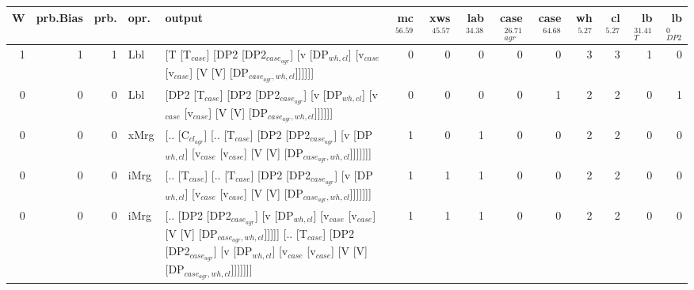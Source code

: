 \begin{tabularx}{\linewidth}{rrrlXrrrrrrrrr}
\hline
   W &   prb.Bias &   prb. & opr.   & output                                                                                                                                                                                 &   mc$^{56.59}$ &   xws$^{45.57}$ &   lab$^{34.38}$ &   case$_{agr}^{26.71}$ &   case$^{64.68}$ &   wh$^{5.27}$ &   cl$^{5.27}$ &   lb$_{T}^{31.41}$ &   lb$_{DP2}^{0}$ \\
\hline
   1 &       1 &   1 & Lbl  & [T [T$_{case}$] [DP2 [DP2$_{case_{agr}}$] [v [DP$_{wh,cl}$] [v$_{case}$ [v$_{case}$] [V [V] [DP$_{case_{agr},wh,cl}$]]]]]]                                                                                         &            0 &             0 &             0 &                  0 &              0 &           3 &           3 &              1 &            0 \\
   0 &       0 &   0 & Lbl  & [DP2 [T$_{case}$] [DP2 [DP2$_{case_{agr}}$] [v [DP$_{wh,cl}$] [v$_{case}$ [v$_{case}$] [V [V] [DP$_{case_{agr},wh,cl}$]]]]]]                                                                                       &            0 &             0 &             0 &                  0 &              1 &           2 &           2 &              0 &            1 \\
   0 &       0 &   0 & xMrg & [.. [C$_{cl_{agr}}$] [.. [T$_{case}$] [DP2 [DP2$_{case_{agr}}$] [v [DP$_{wh,cl}$] [v$_{case}$ [v$_{case}$] [V [V] [DP$_{case_{agr},wh,cl}$]]]]]]]                                                                        &            1 &             0 &             1 &                  0 &              0 &           2 &           2 &              0 &            0 \\
   0 &       0 &   0 & iMrg & [.. [T$_{case}$] [.. [T$_{case}$] [DP2 [DP2$_{case_{agr}}$] [v [DP$_{wh,cl}$] [v$_{case}$ [v$_{case}$] [V [V] [DP$_{case_{agr},wh,cl}$]]]]]]]                                                                          &            1 &             1 &             1 &                  0 &              0 &           2 &           2 &              0 &            0 \\
   0 &       0 &   0 & iMrg & [.. [DP2 [DP2$_{case_{agr}}$] [v [DP$_{wh,cl}$] [v$_{case}$ [v$_{case}$] [V [V] [DP$_{case_{agr},wh,cl}$]]]]] [.. [T$_{case}$] [DP2 [DP2$_{case_{agr}}$] [v [DP$_{wh,cl}$] [v$_{case}$ [v$_{case}$] [V [V] [DP$_{case_{agr},wh,cl}$]]]]]]] &            1 &             1 &             1 &                  0 &              0 &           2 &           2 &              0 &            0 \\

\end{tabularx}
